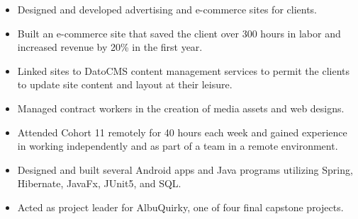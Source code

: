 \documentclass[12pt,letter]{altacv}
\begin{document}

\begin{fullwidth}
\makecvheader
\end{fullwidth}



  \begin{itemize}
  \item Designed and developed advertising and e-commerce sites for clients.
  \item Built an e-commerce site that saved the client over 300 hours in labor and increased revenue by 20\% in the first year.
  \item Linked sites to DatoCMS content management services to permit the clients to update site content and layout at their leisure.
  \item Managed contract workers in the creation of media assets and web designs.
  \end{itemize}

  \divider

  \begin{itemize}
  \item Attended Cohort 11 remotely for 40 hours each week and gained experience in working independently and as part of a team in a remote environment.
  \item Designed and built several Android apps and Java programs utilizing Spring, Hibernate, JavaFx, JUnit5, and SQL.
  \item Acted as project leader for AlbuQuirky, one of four final capstone projects.
  \end{itemize}
\end{document}
